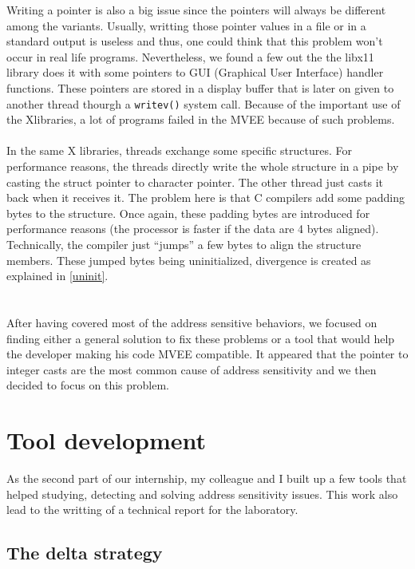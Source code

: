 \documentclass[english]{enstaPRE}
\begin{document}
Writing a pointer is also a big issue since the pointers will always be different among the variants.
Usually, writting those pointer values in a file or in a standard output is useless and thus, one could think that this problem won't occur in
real life programs. Nevertheless, we found a few out the the libx11 library does it with some pointers to GUI 
(Graphical User Interface) handler functions. These pointers are stored in a display buffer that is later on given to another thread 
thourgh a \texttt{writev()} system call.
Because of the important use of the Xlibraries, a lot of programs failed in the MVEE because of such problems.
\\ \\
In the same X libraries, threads exchange some specific structures. For performance reasons, the threads directly write the whole 
structure in a pipe by casting the struct pointer to character pointer. The other thread just casts it back when it receives it.
The problem here is that C compilers add some padding bytes to the structure. Once again, these padding bytes are introduced for performance
reasons (the processor is faster if the data are 4 bytes aligned). Technically, the compiler just ``jumps'' a few bytes to align 
the structure members. These jumped bytes being uninitialized, divergence is created as explained in \ref{uninit}.
\\ \\ \\

After having covered most of the address sensitive behaviors, we focused on finding either a general solution to fix these 
problems or a tool that would help the developer making his code MVEE compatible.
It appeared that the pointer to integer casts are the most common cause of address sensitivity and we then decided to focus on this 
problem.

\chapter{Tool development}

As the second part of our internship, my colleague and I built up a few tools that helped studying, detecting and solving address
sensitivity issues. This work also lead to the writting of a technical report for the laboratory.

\section{The delta strategy}
\end{document}
